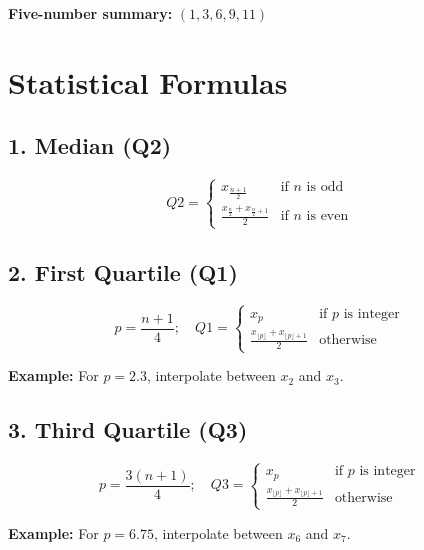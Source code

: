 \documentclass[a4paper,10pt]{article}
\begin{document}
\textbf{Five-number summary:} \((1, 3, 6, 9, 11)\)

\newpage %

\section*{\centering Statistical Formulas}

\subsection*{1. Median (Q2)}

\[
Q2 = \begin{cases}
x_{\frac{n+1}{2}} & \text{if } n \text{ is odd} \\
\frac{x_{\frac{n}{2}} + x_{\frac{n}{2}+1}}{2} & \text{if } n \text{ is even}
\end{cases}
\]

\vspace{0.5cm}

\subsection*{2. First Quartile (Q1)}

\[
p = \frac{n+1}{4}; \quad Q1 = \begin{cases}
x_p & \text{if } p \text{ is integer} \\
\frac{x_{\lfloor p \rfloor} + x_{\lfloor p \rfloor + 1}}{2} & \text{otherwise}
\end{cases}
\]

\textbf{Example:} For \(p = 2.3\), interpolate between \(x_2\) and \(x_3\).

\vspace{0.5cm}

\subsection*{3. Third Quartile (Q3)}

\[
p = \frac{3(n+1)}{4}; \quad Q3 = \begin{cases}
x_p & \text{if } p \text{ is integer} \\
\frac{x_{\lfloor p \rfloor} + x_{\lfloor p \rfloor + 1}}{2} & \text{otherwise}
\end{cases}
\]

\textbf{Example:} For \(p = 6.75\), interpolate between \(x_6\) and \(x_7\).

\vspace{0.5cm}
\end{document}
